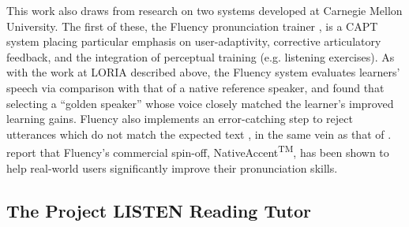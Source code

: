 	This work also draws from research on two systems developed at Carnegie Mellon University.
%
	The first of these, the Fluency pronunciation trainer \citep{Eskenazi1998,Eskenazi2000}, is a CAPT system placing particular emphasis on
user-adaptivity, corrective articulatory feedback, and the integration of perceptual training (e.g. listening exercises). As with the work at LORIA described above, the Fluency system evaluates learners' speech via comparison with that of a native reference speaker, and \textcite{Probst2002} found that selecting a ``golden speaker'' whose voice closely matched the learner's improved learning gains. 
Fluency also implements an error-catching step to reject utterances which do not match the expected text \citep{Eskenazi2000}, in the same vein as that of \textcite{Mesbahi2011,Orosanu2012}. \textcite{Eskenazi2007} report that Fluency's commercial spin-off, NativeAccent\textsuperscript{TM}, has been shown to help real-world users significantly improve their pronunciation skills.
	
	\subsection{The Project LISTEN Reading Tutor}
	\label{sec:capt:listen}
	
